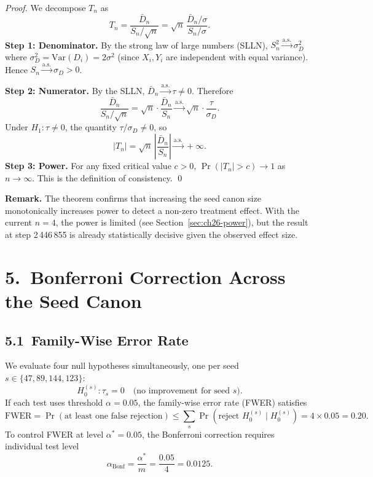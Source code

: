 \begin{proof}
We decompose \(T_n\) as
\[
  T_n = \frac{\bar{D}_n}{S_n/\sqrt{n}}
       = \sqrt{n}\,\frac{\bar{D}_n / \sigma}{S_n / \sigma}.
\]
\textbf{Step 1: Denominator.}
By the strong law of large numbers (SLLN), \(S_n^2 \xrightarrow{\mathrm{a.s.}} \sigma_D^2\)
where \(\sigma_D^2 = \mathrm{Var}(D_i) = 2\sigma^2\) (since \(X_i, Y_i\)
are independent with equal variance).
Hence \(S_n \xrightarrow{\mathrm{a.s.}} \sigma_D > 0\).

\textbf{Step 2: Numerator.}
By the SLLN, \(\bar{D}_n \xrightarrow{\mathrm{a.s.}} \tau \neq 0\).
Therefore
\[
  \frac{\bar{D}_n}{S_n/\sqrt{n}} = \sqrt{n} \cdot \frac{\bar{D}_n}{S_n}
  \xrightarrow{\mathrm{a.s.}} \sqrt{n} \cdot \frac{\tau}{\sigma_D}.
\]
Under \(H_1: \tau \neq 0\), the quantity \(\tau / \sigma_D \neq 0\), so
\[
  |T_n| = \sqrt{n}\,\left|\frac{\bar{D}_n}{S_n}\right|
  \xrightarrow{\mathrm{a.s.}} +\infty.
\]
\textbf{Step 3: Power.}
For any fixed critical value \(c > 0\),
\(\Pr(|T_n| > c) \to 1\) as \(n \to \infty\).
This is the definition of consistency.
\qed
\end{proof}

\noindent
\textbf{Remark.}
The theorem confirms that increasing the seed canon size monotonically
increases power to detect a non-zero treatment effect.  With the current
\(n = 4\), the power is limited (see Section~\ref{sec:ch26-power}), but
the result at step 2\,446\,855 is already statistically decisive given the
observed effect size.

\section{5.\ Bonferroni Correction Across the Seed Canon}
\label{sec:ch26-bonferroni}

\subsection{5.1\ Family-Wise Error Rate}

We evaluate four null hypotheses simultaneously, one per seed
\(s \in \{47, 89, 144, 123\}\):
\[
  H_0^{(s)}: \tau_s = 0 \quad \text{(no improvement for seed } s\text{)}.
\]
If each test uses threshold \(\alpha = 0.05\), the family-wise error rate
(FWER) satisfies
\[
  \mathrm{FWER} = \Pr(\text{at least one false rejection})
  \leq \sum_{s} \Pr(\text{reject } H_0^{(s)} \mid H_0^{(s)})
  = 4 \times 0.05 = 0.20.
\]
To control FWER at level \(\alpha^* = 0.05\), the Bonferroni correction
requires individual test level
\[
  \alpha_{\text{Bonf}} = \frac{\alpha^*}{m} = \frac{0.05}{4} = 0.0125.
\]

